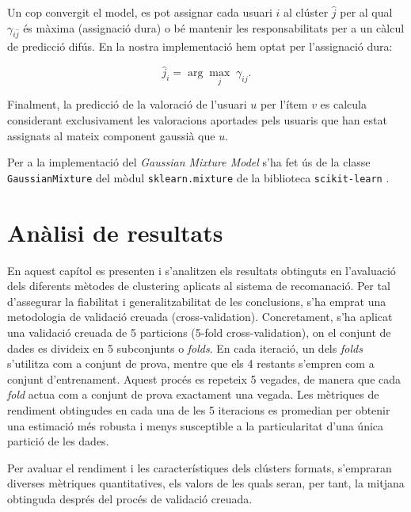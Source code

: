 \documentclass[a4paper,12pt]{report}
\begin{document}
Un cop convergit el model, es pot assignar cada usuari $i$ al clúster $\hat{j}$ per al qual $\gamma_{i\hat{j}}$ és màxima (assignació dura) o bé mantenir les responsabilitats per a un càlcul de predicció difús. En la nostra implementació hem optat per l’assignació dura:

\[
\hat{j}_i = \arg\max_{j} \;\gamma_{ij}.
\]

Finalment, la predicció de la valoració de l’usuari $u$ per l’ítem $v$ es calcula considerant exclusivament les valoracions aportades pels usuaris que han estat assignats al mateix component gaussià que $u$.

Per a la implementació del \emph{Gaussian Mixture Model} s'ha fet ús de la classe \texttt{GaussianMixture} del mòdul \texttt{sklearn.mixture} de la biblioteca \texttt{scikit-learn} \cite{pedregosa2011scikit}.

\chapter{Anàlisi de resultats}
\label{chap:analisi_resultats}

En aquest capítol es presenten i s'analitzen els resultats obtinguts en l'avaluació dels diferents mètodes de clustering aplicats al sistema de recomanació. Per tal d'assegurar la fiabilitat i generalitzabilitat de les conclusions, s'ha emprat una metodologia de validació creuada (cross-validation). Concretament, s'ha aplicat una validació creuada de 5 particions (5-fold cross-validation), on el conjunt de dades es divideix en 5 subconjunts o \textit{folds}. En cada iteració, un dels \textit{folds} s'utilitza com a conjunt de prova, mentre que els 4 restants s'empren com a conjunt d'entrenament. Aquest procés es repeteix 5 vegades, de manera que cada \textit{fold} actua com a conjunt de prova exactament una vegada. Les mètriques de rendiment obtingudes en cada una de les 5 iteracions es promedian per obtenir una estimació més robusta i menys susceptible a la particularitat d'una única partició de les dades.

Per avaluar el rendiment i les característiques dels clústers formats, s'empraran diverses mètriques quantitatives, els valors de les quals seran, per tant, la mitjana obtinguda després del procés de validació creuada.
\end{document}
